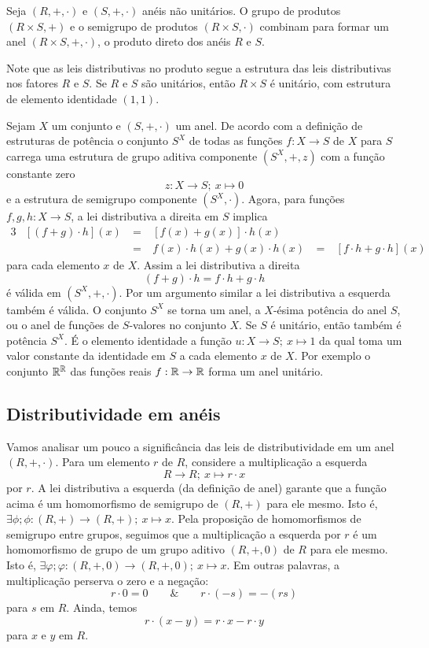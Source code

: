 \begin{exmp}
  Seja $(R,+,\cdot)$ e $(S,+,\cdot)$ anéis não unitários. O grupo de produtos $(R\times S, +)$ e o semigrupo de produtos $(R\times S, \cdot)$ combinam para formar um anel $(R\times S, +, \cdot)$, o produto direto dos anéis $R$ e $S$.

  Note que as leis distributivas no produto segue a estrutura das leis distributivas nos fatores $R$ e $S$. Se $R$ e $S$ são unitários, então $R\times S$ é unitário, com estrutura de elemento identidade $(1,1)$.
\end{exmp}

\begin{exmp}
  Sejam $X$ um conjunto e $(S, +, \cdot)$ um anel. De acordo com a definição de estruturas de potência o conjunto $S^{X}$ de todas as funções $f: X \to S$ de $X$ para $S$ carrega uma estrutura de grupo aditiva componente $(S^{X},+, z)$ com a função constante zero $$z: X \to S;\ x\mapsto 0$$ e a estrutura de semigrupo componente $(S^{X}, \cdot)$. Agora, para funções $f,g,h: X\to S$, a lei distributiva a direita em $S$ implica
  \begin{alignat*}{3}
    & [(f+g)\cdot h](x)\ &=&\ [f(x)+g(x)] \cdot h(x)\\
    & &=&\ f(x) \cdot h(x) + g(x) \cdot h(x)\ &=&\ [f\cdot h+g \cdot h](x)  
  \end{alignat*}
  para cada elemento $x$ de $X$. Assim a lei distributiva a direita $$(f+g) \cdot h = f\cdot h +g \cdot h$$ é válida em $(S^{X},+,\cdot)$. Por um argumento similar a lei distributiva a esquerda também é válida. O conjunto $S^{X}$ se torna um anel, a $X$-ésima potência do anel $S$, ou o anel de funções de $S$-valores no conjunto $X$. Se $S$ é unitário, então também é potência $S^{X}$. É o elemento identidade a função $u: X\to S;\ x\mapsto 1$ da qual toma um valor constante da identidade em $S$ a cada elemento $x$ de $X$. Por exemplo o conjunto $\mathbb{R}^{\mathbb{R}}$ das funções reais $f: \mathbb{R} \to \mathbb{R}$ forma um anel unitário.
\end{exmp}

\subsection{Distributividade em anéis}
Vamos analisar um pouco a significância das leis de distributividade em um anel $(R, +, \cdot)$. 
Para um elemento $r$ de $R$, considere a multiplicação a esquerda $$R \to R;\ x \mapsto r \cdot x$$ por $r$. A lei distributiva a esquerda (da definição de anel) garante que a função acima é um homomorfismo de semigrupo de $(R, +)$ para ele mesmo. Isto é, $\exists \phi; \phi: (R, +) \to (R, +);\ x \mapsto x$. Pela proposição de homomorfismos de semigrupo entre grupos, seguimos que a multiplicação a esquerda por $r$ é um homomorfismo de grupo de um grupo aditivo $(R,+,0)$ de $R$ para ele mesmo. Isto é, $\exists \varphi; \varphi: (R,+,0) \to (R,+,0);\ x \mapsto x$. Em outras palavras, a multiplicação perserva o zero e a negação: $$r \cdot 0 = 0\quad \quad \&\quad \quad r \cdot (-s) = -(rs)$$ para $s$ em $R$. Ainda, temos $$r \cdot (x-y) = r\cdot x - r \cdot y$$ para $x$ e $y$ em $R$.

